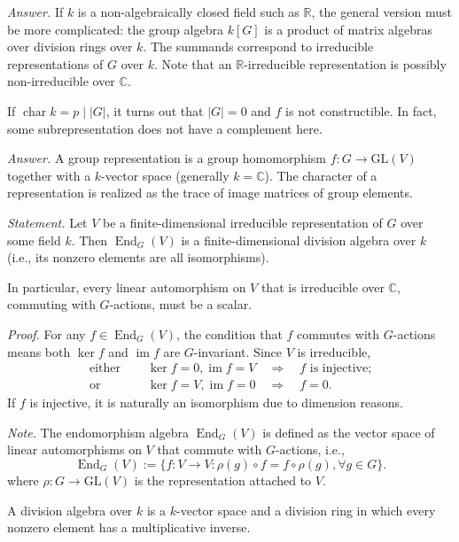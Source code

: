 \documentclass{mathproblems}
\newcommand\R{\mathbb{R}}
\newcommand\C{\mathbb{C}}
\newcommand\GL{\mathrm{GL}}
\DeclareMathOperator{\End}{End}
\begin{document}
\begin{questions}
\textit{Answer.} If $k$ is a non-algebraically closed field such as $\R$, the general version must be more complicated: the group algebra $k[G]$ is a product of matrix algebras over division rings over $k$. The summands correspond to irreducible representations of $G$ over $k$. Note that an $\R$-irreducible representation is possibly non-irreducible over $\C$.

If $\operatorname{char} k=p\mid |G|$, it turns out that $|G|=0$ and $f$ is not constructible. In fact, some subrepresentation does not have a complement here.


\textit{Answer.} A group representation is a group homomorphism $f: G\to \GL(V)$ together with a $k$-vector space (generally $k=\C$). The character of a representation is realized as the trace of image matrices of group elements.



{\color{violet}
\textit{Statement.} Let $V$ be a finite-dimensional irreducible representation of $G$ over some field $k$. Then $\End_G(V)$ is a finite-dimensional division algebra over $k$ (i.e., its nonzero elements are all isomorphisms).

In particular, every linear automorphism on $V$ that is irreducible over $\C$, commuting with $G$-actions, must be a scalar.}

\textit{Proof.} For any $f\in \End_G(V)$, the condition that $f$ commutes with $G$-actions means both $\ker f$ and $\operatorname{im} f$ are $G$-invariant. Since $V$ is irreducible,
$$
\begin{aligned}
\text{either }\quad & \ker f=0, \operatorname{im} f=V \quad \Longrightarrow \quad f \text{ is injective;}\\
\text{or }\quad & \ker f=V, \operatorname{im} f=0 \quad \Longrightarrow \quad f=0.
\end{aligned}
$$
If $f$ is injective, it is naturally an isomorphism due to dimension reasons.

\textit{Note.} The endomorphism algebra $\End_G(V)$ is defined as the vector space of linear automorphisms on $V$ that commute with $G$-actions, i.e.,
$$
\End_G(V):=\{f:V\to V: \rho(g)\circ f=f\circ \rho(g), \forall g\in G\}.
$$
where $\rho: G\to \GL(V)$ is the representation attached to $V$.

A division algebra over $k$ is a $k$-vector space and a division ring in which every nonzero element has a multiplicative inverse.


\end{questions}
\end{document}
